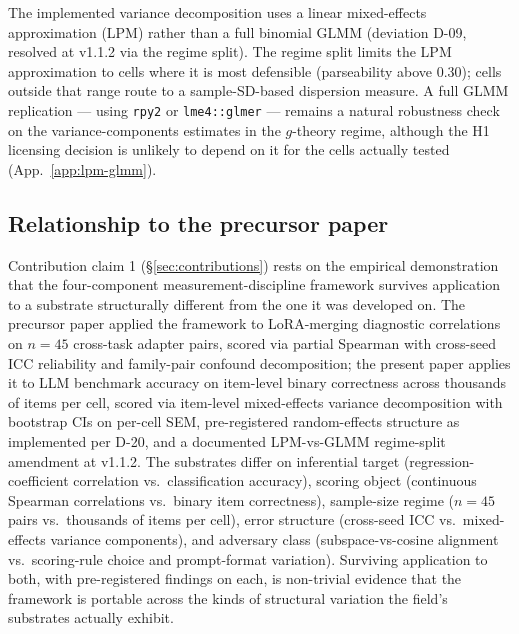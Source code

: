 \documentclass[11pt]{article}
\begin{document}
The implemented variance decomposition uses a linear mixed-effects approximation (LPM) rather than a full binomial GLMM (deviation D-09, resolved at v1.1.2 via the regime split). The regime split limits the LPM approximation to cells where it is most defensible (parseability above $0.30$); cells outside that range route to a sample-SD-based dispersion measure. A full GLMM replication --- using \texttt{rpy2} or \texttt{lme4::glmer} --- remains a natural robustness check on the variance-components estimates in the $g$-theory regime, although the H1 licensing decision is unlikely to depend on it for the cells actually tested (App.~\ref{app:lpm-glmm}).

\subsection{Relationship to the precursor paper}
\label{sec:relationship-to-precursor}

\begin{sloppypar}
Contribution claim 1 (§\ref{sec:contributions}) rests on the empirical demonstration that the four-component measurement-discipline framework survives application to a substrate structurally different from the one it was developed on. The precursor paper \citep{anonymized2026n134} applied the framework to LoRA-merging diagnostic correlations on $n = 45$ cross-task adapter pairs, scored via partial Spearman with cross-seed ICC reliability and family-pair confound decomposition; the present paper applies it to LLM benchmark accuracy on item-level binary correctness across thousands of items per cell, scored via item-level mixed-effects variance decomposition with bootstrap CIs on per-cell SEM, pre-registered random-effects structure as implemented per D-20, and a documented LPM-vs-GLMM regime-split amendment at v1.1.2. The substrates differ on inferential target (regression-coefficient correlation vs.\ classification accuracy), scoring object (continuous Spearman correlations vs.\ binary item correctness), sample-size regime ($n = 45$ pairs vs.\ thousands of items per cell), error structure (cross-seed ICC vs.\ mixed-effects variance components), and adversary class (subspace-vs-cosine alignment vs.\ scoring-rule choice and prompt-format variation). Surviving application to both, with pre-registered findings on each, is non-trivial evidence that the framework is portable across the kinds of structural variation the field's substrates actually exhibit.
\end{sloppypar}
\end{document}
